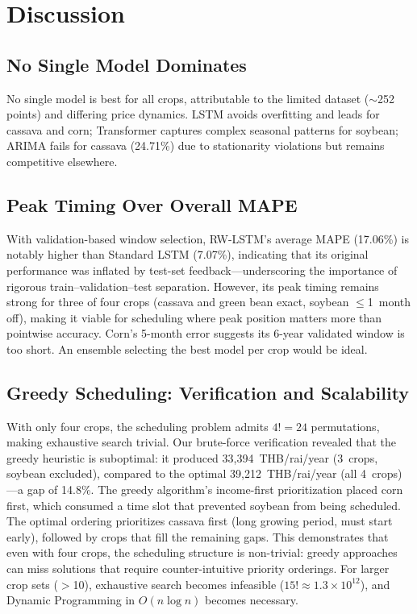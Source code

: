 \documentclass[conference]{IEEEtran}
\begin{document}
\section{Discussion}

\subsection{No Single Model Dominates}

No single model is best for all crops, attributable to the limited dataset ($\sim$252 points) and differing price dynamics. LSTM avoids overfitting and leads for cassava and corn; Transformer captures complex seasonal patterns for soybean; ARIMA fails for cassava (24.71\%) due to stationarity violations but remains competitive elsewhere.

\subsection{Peak Timing Over Overall MAPE}

With validation-based window selection, RW-LSTM's average MAPE (17.06\%) is notably higher than Standard LSTM (7.07\%), indicating that its original performance was inflated by test-set feedback---underscoring the importance of rigorous train--validation--test separation. However, its peak timing remains strong for three of four crops (cassava and green bean exact, soybean $\leq$1~month off), making it viable for scheduling where peak position matters more than pointwise accuracy. Corn's 5-month error suggests its 6-year validated window is too short. An ensemble selecting the best model per crop would be ideal.

\subsection{Greedy Scheduling: Verification and Scalability}

With only four crops, the scheduling problem admits $4! = 24$ permutations, making exhaustive search trivial. Our brute-force verification revealed that the greedy heuristic is suboptimal: it produced 33,394~THB/rai/year (3~crops, soybean excluded), compared to the optimal 39,212~THB/rai/year (all 4~crops)---a gap of 14.8\%. The greedy algorithm's income-first prioritization placed corn first, which consumed a time slot that prevented soybean from being scheduled. The optimal ordering prioritizes cassava first (long growing period, must start early), followed by crops that fill the remaining gaps. This demonstrates that even with four crops, the scheduling structure is non-trivial: greedy approaches can miss solutions that require counter-intuitive priority orderings. For larger crop sets ($>$10), exhaustive search becomes infeasible ($15! \approx 1.3 \times 10^{12}$), and Dynamic Programming in $O(n \log n)$ becomes necessary.
\end{document}

